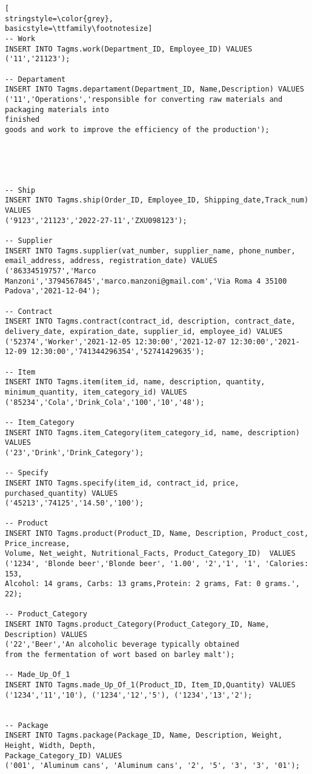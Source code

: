 \begin{lstlisting}[
stringstyle=\color{grey},
basicstyle=\ttfamily\footnotesize]
-- Work
INSERT INTO Tagms.work(Department_ID, Employee_ID) VALUES 
('11','21123');

-- Departament
INSERT INTO Tagms.departament(Department_ID, Name,Description) VALUES
('11','Operations','responsible for converting raw materials and packaging materials into 
finished
goods and work to improve the efficiency of the production');





-- Ship
INSERT INTO Tagms.ship(Order_ID, Employee_ID, Shipping_date,Track_num) VALUES 
('9123','21123','2022-27-11','ZXU098123');

-- Supplier
INSERT INTO Tagms.supplier(vat_number, supplier_name, phone_number, email_address, address, registration_date) VALUES
('86334519757','Marco Manzoni','3794567845','marco.manzoni@gmail.com','Via Roma 4 35100 Padova','2021-12-04');

-- Contract
INSERT INTO Tagms.contract(contract_id, description, contract_date, delivery_date, expiration_date, supplier_id, employee_id) VALUES 
('52374','Worker','2021-12-05 12:30:00','2021-12-07 12:30:00','2021-12-09 12:30:00','741344296354','52741429635');

-- Item
INSERT INTO Tagms.item(item_id, name, description, quantity, minimum_quantity, item_category_id) VALUES 
('85234','Cola','Drink_Cola','100','10','48');

-- Item_Category
INSERT INTO Tagms.item_Category(item_category_id, name, description) VALUES
('23','Drink','Drink_Category');

-- Specify
INSERT INTO Tagms.specify(item_id, contract_id, price, purchased_quantity) VALUES
('45213','74125','14.50','100');

-- Product
INSERT INTO Tagms.product(Product_ID, Name, Description, Product_cost, Price_increase,
Volume, Net_weight, Nutritional_Facts, Product_Category_ID)  VALUES 
('1234', 'Blonde beer','Blonde beer', '1.00', '2','1', '1', 'Calories: 153, 
Alcohol: 14 grams, Carbs: 13 grams,Protein: 2 grams, Fat: 0 grams.', 22);

-- Product_Category
INSERT INTO Tagms.product_Category(Product_Category_ID, Name, Description) VALUES 
('22','Beer','An alcoholic beverage typically obtained 
from the fermentation of wort based on barley malt');

-- Made_Up_Of_1
INSERT INTO Tagms.made_Up_Of_1(Product_ID, Item_ID,Quantity) VALUES
('1234','11','10'), ('1234','12','5'), ('1234','13','2');


-- Package
INSERT INTO Tagms.package(Package_ID, Name, Description, Weight, Height, Width, Depth, 
Package_Category_ID) VALUES
('001', 'Aluminum cans', 'Aluminum cans', '2', '5', '3', '3', '01');


\end{lstlisting}
